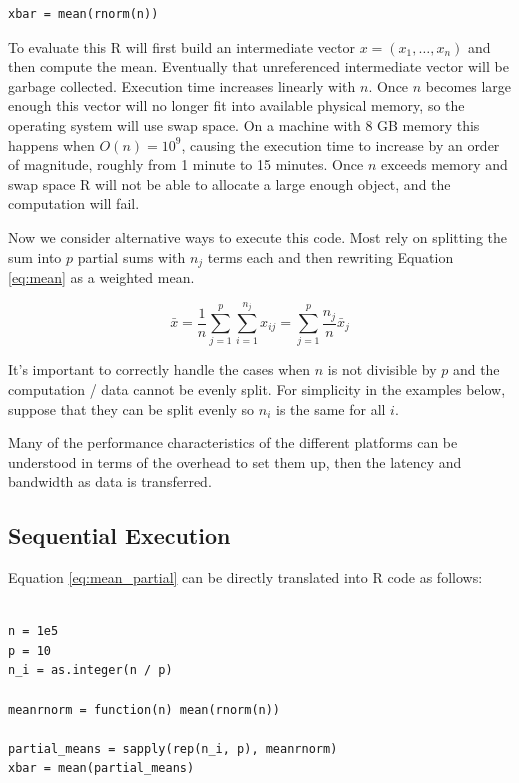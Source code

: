 \documentclass[12pt]{article}
\begin{document}
\begin{verbatim}
xbar = mean(rnorm(n))
\end{verbatim}

To evaluate this R will first build an intermediate vector $x = (x_1,
\dots, x_n)$ and then compute the mean. Eventually that unreferenced
intermediate vector will be garbage collected.
Execution time increases
linearly with $n$. Once $n$ becomes large
enough this vector will no longer fit into available physical memory, so
the operating system will use swap space. On a machine with 8 GB memory
this happens when $O(n) = 10^9$, causing the execution time
to increase by an order of magnitude, roughly from 1 minute to 15
minutes. Once $n$ exceeds memory and swap space R will not be able to allocate a
large enough object, and the computation will fail.

Now we consider alternative ways to execute this code.  Most rely on
splitting the sum into $p$ partial sums with $n_j$ terms each and then rewriting
Equation \ref{eq:mean} as a weighted mean.

\begin{equation}
    \bar{x} = \frac{1}{n} \sum_{j = 1}^p \sum_{i = 1}^{n_j} x_{ij}
    = \sum_{j = 1}^p \frac{n_j}{n} \bar{x}_j
\label{eq:mean_partial}
\end{equation}

It's important to correctly handle the cases when $n$ is not divisible by $p$
and the computation / data cannot be evenly split. For simplicity in the
examples below, suppose that they can be split evenly so $n_i$ is the same
for all $i$.

Many of the performance characteristics of the different platforms can be
understood in terms of the overhead to set them up, then the latency and
bandwidth as data is transferred.

\subsection{Sequential Execution}
\label{section:sequential}

Equation \ref{eq:mean_partial} can be directly translated into R code as
follows:

\begin{verbatim}

n = 1e5
p = 10
n_i = as.integer(n / p)

meanrnorm = function(n) mean(rnorm(n))

partial_means = sapply(rep(n_i, p), meanrnorm)
xbar = mean(partial_means)
\end{verbatim}
\end{document}

